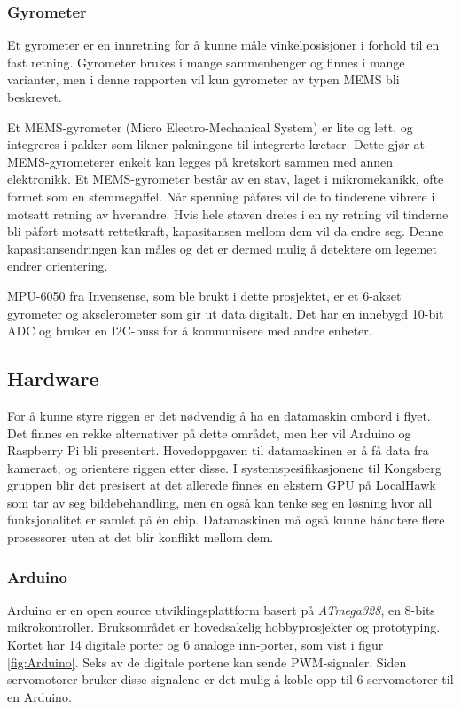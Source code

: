 \subsubsection{Gyrometer}

Et gyrometer er en innretning for å kunne måle vinkelposisjoner i forhold til en fast retning. Gyrometer brukes i mange sammenhenger og finnes i mange varianter, men i denne rapporten vil kun gyrometer av typen MEMS bli beskrevet. 

Et MEMS-gyrometer (Micro Electro-Mechanical System) er lite og lett, og integreres i pakker som likner pakningene til integrerte kretser. Dette gjør at MEMS-gyrometerer enkelt kan legges på kretskort sammen med annen elektronikk. Et MEMS-gyrometer består av en stav, laget i mikromekanikk, ofte formet som en stemmegaffel. Når spenning påføres vil de to tinderene vibrere i motsatt retning av hverandre. Hvis hele staven dreies i en ny retning vil tinderne bli påført motsatt rettetkraft, kapasitansen mellom dem vil da endre seg. Denne kapasitansendringen kan måles og det er dermed mulig å detektere om legemet endrer orientering.\cite{MEMS}

MPU-6050 fra Invensense, som ble brukt i dette prosjektet, er et 6-akset gyrometer og akselerometer som gir ut data digitalt. Det har en innebygd 10-bit ADC og bruker en I2C-buss for å kommunisere med andre enheter.\cite{InSens}

\subsection{Hardware}
For å kunne styre riggen er det nødvendig å ha en datamaskin ombord i flyet. Det finnes en rekke alternativer på dette området, men her vil Arduino og Raspberry Pi bli presentert. Hovedoppgaven til datamaskinen er å få data fra kameraet, og orientere riggen etter disse. I systemspesifikasjonene til Kongsberg gruppen blir det presisert at det allerede finnes en ekstern GPU på LocalHawk som tar av seg bildebehandling, men en også kan tenke seg en løsning hvor all funksjonalitet er samlet på én chip. Datamaskinen må også kunne håndtere flere prosessorer uten at det blir konflikt mellom dem.

\subsubsection{Arduino}
Arduino er en open source utviklingsplattform basert på \textit{ATmega328}, en 8-bits mikrokontroller. Bruksområdet er hovedsakelig hobbyprosjekter og prototyping. Kortet har 14 digitale porter og 6 analoge inn-porter, som vist i figur \ref{fig:Arduino}. Seks av de digitale portene kan sende PWM-signaler. Siden servomotorer bruker disse signalene er det mulig å koble opp til 6 servomotorer til en Arduino. 

